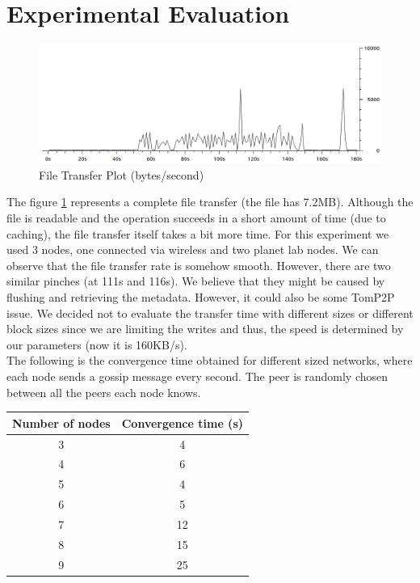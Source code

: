 \documentclass[times,9pt,article]{llncs}
\begin{document}
\section{Experimental Evaluation}

\begin{figure}
\centering
\includegraphics[keepaspectratio,width=1\textwidth]{images/file_transfer.png}
\caption{File Transfer Plot (bytes/second)}
\label{fig:file_transfer}
\end{figure}
The figure \ref{fig:file_transfer} represents a complete file transfer (the file has 7.2MB). Although the file is readable and the operation succeeds in a short amount of time (due to caching), the file transfer itself takes a bit more time. For this experiment we used 3 nodes, one connected via wireless and two planet lab nodes. We can observe that the file transfer rate is somehow smooth. However, there are two similar pinches (at 111s and 116s). We believe that they might be caused by flushing and retrieving the metadata. However, it could also be some TomP2P issue. We decided not to evaluate the transfer time with different sizes or different block sizes since we are limiting the writes and thus, the speed is determined by our parameters (now it is 160KB/s). \\
The following is the convergence time obtained for different sized networks, where each node sends a gossip message every second. The peer is randomly chosen between all the peers each node knows.\\

\begin{tabular}{|c|c|}
  \hline  
  \textbf{Number of nodes} & \textbf{Convergence time (s)} \\ \hline             
  3 & 4 \\
  4 & 6 \\
  5 & 4 \\
  6 & 5 \\
  7 & 12 \\
  8 & 15 \\
  9 & 25 \\
  \hline  
\end{tabular}\\
\end{document}
